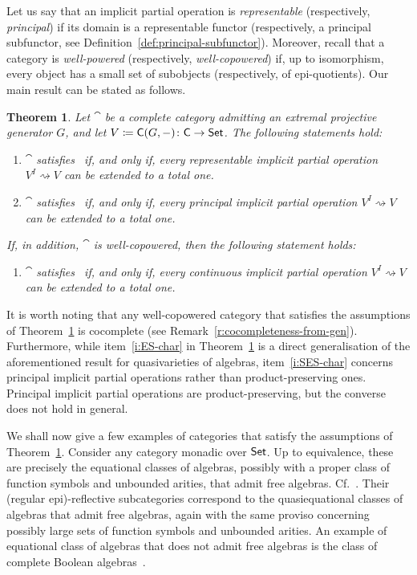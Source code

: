 \documentclass[a4paper,10pt,reqno]{amsart}
\newtheorem{theorem}{Theorem}[section]
\theoremstyle{definition}
\theoremstyle{remark}
\begin{document}
Let us say that an implicit partial operation is \emph{representable} (respectively, \emph{principal}) if its domain is a representable functor (respectively, a principal subfunctor, see Definition~\ref{def:principal-subfunctor}). Moreover, recall that a category is \emph{well-powered} (respectively, \emph{well-copowered}) if, up to isomorphism, every object has a small set of subobjects (respectively, of epi-quotients).
%
Our main result can be stated as follows.


\begin{theorem}\label{t:main}
Let $\cat$ be a complete category admitting an extremal projective generator $G$, and let $V\coloneqq {\sf C}(G,-)\colon {\sf C}\to{\sf Set}$. The following statements hold:
\begin{enumerate}[label=(\roman*)]
\item\label{i:ES-char-representable} $\cat$ satisfies \ES~if, and only if, every representable implicit partial operation $V^{I} \rightsquigarrow V$ can be extended to a total one.
\item\label{i:SES-char} $\cat$ satisfies \SES~if, and only if, every principal implicit partial operation $V^{I} \rightsquigarrow V$ can be extended to a total one.
\end{enumerate}
If, in addition, $\cat$ is well-copowered, then the following statement holds:
\begin{enumerate}[label=(\roman*),resume]
\item\label{i:ES-char} $\cat$ satisfies \ES~if, and only if, every continuous implicit partial operation $V^{I} \rightsquigarrow V$ can be extended to a total one.
\end{enumerate}
\end{theorem}

It is worth noting that any well-copowered category that satisfies the assumptions of Theorem~\ref{t:main} is cocomplete (see Remark~\ref{r:cocompleteness-from-gen}).
%
Furthermore, while item~\ref{i:ES-char} in Theorem~\ref{t:main} is a direct generalisation of the aforementioned result for quasivarieties of algebras, item~\ref{i:SES-char} concerns principal implicit partial operations rather than product-preserving ones. Principal implicit partial operations are product-preserving, but the converse does not hold in general.

\medskip
We shall now give a few examples of categories that satisfy the assumptions of Theorem~\ref{t:main}. 
%
Consider any category monadic over ${\sf Set}$. Up to equivalence, these are precisely the equational classes of algebras, possibly with a proper class of function symbols and unbounded arities, that admit free algebras. Cf.\ \cite[Proposition~I.3.8]{Johnstone1982}. 
%
Their (regular epi)-reflective subcategories correspond to the quasiequational classes of algebras that admit free algebras, again with the same proviso concerning possibly large sets of function symbols and unbounded arities. An example of equational class of algebras that does not admit free algebras is the class of complete Boolean algebras~\cite{Gaifman1964,Hales1964}.
\end{document}
